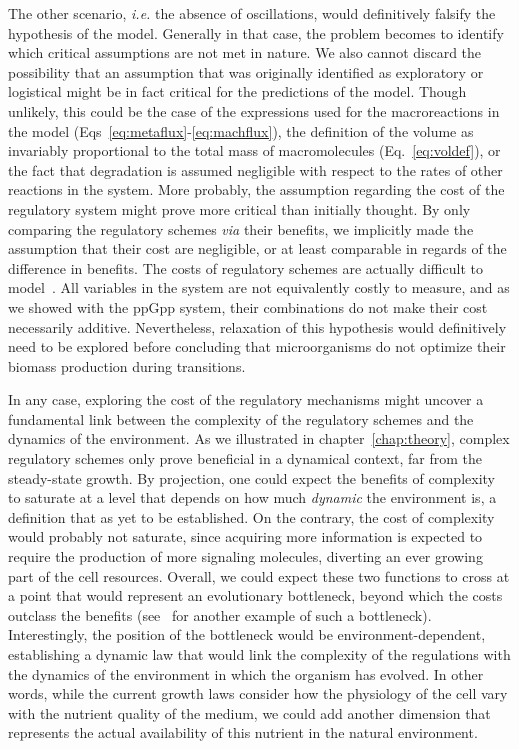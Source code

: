 The other scenario, \textit{i.e.} the absence of oscillations, would definitively falsify the hypothesis of the model.
Generally in that case, the problem becomes to identify which critical assumptions are not met in nature.
We also cannot discard the possibility that an assumption that was originally identified as exploratory or logistical might be in fact critical for the predictions of the model.
Though unlikely, this could be the case of the expressions used for the macroreactions in the model (Eqs~\ref{eq:metaflux}-\ref{eq:machflux}), the definition of the volume as invariably proportional to the total mass of macromolecules (Eq.~\ref{eq:voldef}), or the fact that degradation is assumed negligible with respect to the rates of other reactions in the system.
More probably, the assumption regarding the cost of the regulatory system might prove more critical than initially thought.
By only comparing the regulatory schemes \textit{via} their benefits, we implicitly made the assumption that their cost are negligible, or at least comparable in regards of the difference in benefits.
The costs of regulatory schemes are actually difficult to model~\cite{shachrai_cost_2010,dong_gratuitous_1995,dekel_environmental_2005}.
All variables in the system are not equivalently costly to measure, and as we showed with the ppGpp system, their combinations do not make their cost necessarily additive.
Nevertheless, relaxation of this hypothesis would definitively need to be explored before concluding that microorganisms do not optimize their biomass production during transitions.

In any case, exploring the cost of the regulatory mechanisms might uncover a fundamental link between the complexity of the regulatory schemes and the dynamics of the environment.
As we illustrated in chapter~\ref{chap:theory}, complex regulatory schemes only prove beneficial in a dynamical context, far from the steady-state growth.
By projection, one could expect the benefits of complexity to saturate at a level that depends on how much \textit{dynamic} the environment is, a definition that as yet to be established.
On the contrary, the cost of complexity would probably not saturate, since acquiring more information is expected to require the production of more signaling molecules, diverting an ever growing part of the cell resources.
Overall, we could expect these two functions to cross at a point that would represent an evolutionary bottleneck, beyond which the costs outclass the benefits (see~\cite{short_flows_2006} for another example of such a bottleneck).
Interestingly, the position of the bottleneck would be environment-dependent, establishing a dynamic law that would link the complexity of the regulations with the dynamics of the environment in which the organism has evolved.
In other words, while the current growth laws consider how the physiology of the cell vary with the nutrient quality of the medium, we could add another dimension that represents the actual availability of this nutrient in the natural environment.